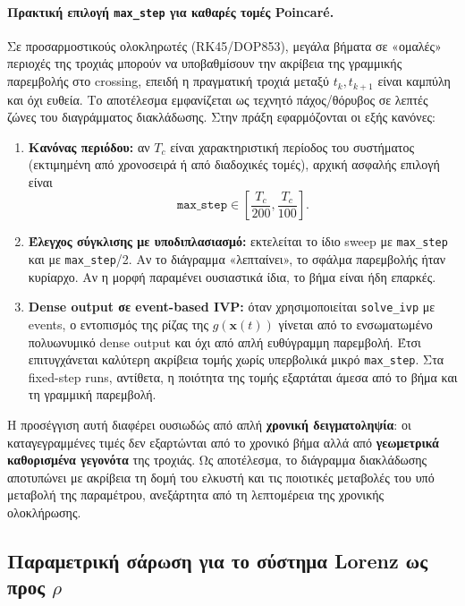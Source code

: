 \documentclass[11pt,a4paper]{report}
\begin{document}
\paragraph{Πρακτική επιλογή \texttt{max\_step} για καθαρές τομές Poincar\'e.}
Σε προσαρμοστικούς ολοκληρωτές (RK45/DOP853), μεγάλα βήματα σε «ομαλές» περιοχές της τροχιάς μπορούν να υποβαθμίσουν την ακρίβεια της γραμμικής παρεμβολής στο crossing, επειδή η πραγματική τροχιά μεταξύ $t_k,t_{k+1}$ είναι καμπύλη και όχι ευθεία. Το αποτέλεσμα εμφανίζεται ως τεχνητό πάχος/θόρυβος σε λεπτές ζώνες του διαγράμματος διακλάδωσης. Στην πράξη εφαρμόζονται οι εξής κανόνες:
\begin{enumerate}
  \item \textbf{Κανόνας περιόδου:} αν $T_c$ είναι χαρακτηριστική περίοδος του συστήματος (εκτιμημένη από χρονοσειρά ή από διαδοχικές τομές), αρχική ασφαλής επιλογή είναι
  \begin{equation}
  \texttt{max\_step}\in\left[\frac{T_c}{200},\frac{T_c}{100}\right].
  \end{equation}
  \item \textbf{Έλεγχος σύγκλισης με υποδιπλασιασμό:} εκτελείται το ίδιο sweep με \texttt{max\_step} και με \texttt{max\_step}/2. Αν το διάγραμμα «λεπταίνει», το σφάλμα παρεμβολής ήταν κυρίαρχο. Αν η μορφή παραμένει ουσιαστικά ίδια, το βήμα είναι ήδη επαρκές.
  \item \textbf{Dense output σε event-based IVP:} όταν χρησιμοποιείται \texttt{solve\_ivp} με events, ο εντοπισμός της ρίζας της $g(\mathbf{x}(t))$ γίνεται από το ενσωματωμένο πολυωνυμικό dense output και όχι από απλή ευθύγραμμη παρεμβολή. Έτσι επιτυγχάνεται καλύτερη ακρίβεια τομής χωρίς υπερβολικά μικρό \texttt{max\_step}. Στα fixed-step runs, αντίθετα, η ποιότητα της τομής εξαρτάται άμεσα από το βήμα και τη γραμμική παρεμβολή.
\end{enumerate}

Η προσέγγιση αυτή διαφέρει ουσιωδώς από απλή \textbf{χρονική δειγματοληψία}:
οι καταγεγραμμένες τιμές δεν εξαρτώνται από το χρονικό βήμα αλλά από
\textbf{γεωμετρικά καθορισμένα γεγονότα} της τροχιάς.
Ως αποτέλεσμα, το διάγραμμα διακλάδωσης αποτυπώνει με ακρίβεια τη
δομή του ελκυστή και τις ποιοτικές μεταβολές του υπό μεταβολή της
παραμέτρου, ανεξάρτητα από τη λεπτομέρεια της χρονικής ολοκλήρωσης.

\subsection{Παραμετρική σάρωση για το σύστημα Lorenz ως προς \texorpdfstring{$\rho$}{rho}}
\end{document}
